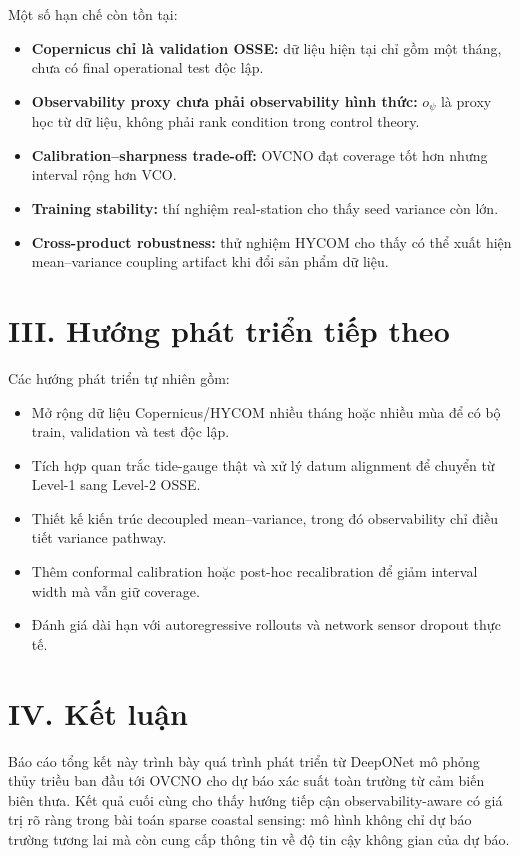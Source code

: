 \documentclass[a4paper, 12pt]{article}
\begin{document}
Một số hạn chế còn tồn tại:
\begin{itemize}
    \item \textbf{Copernicus chỉ là validation OSSE:} dữ liệu hiện tại chỉ gồm một tháng, chưa có final operational test độc lập.
    \item \textbf{Observability proxy chưa phải observability hình thức:} $o_\psi$ là proxy học từ dữ liệu, không phải rank condition trong control theory.
    \item \textbf{Calibration--sharpness trade-off:} OVCNO đạt coverage tốt hơn nhưng interval rộng hơn VCO.
    \item \textbf{Training stability:} thí nghiệm real-station cho thấy seed variance còn lớn.
    \item \textbf{Cross-product robustness:} thử nghiệm HYCOM cho thấy có thể xuất hiện mean--variance coupling artifact khi đổi sản phẩm dữ liệu.
\end{itemize}

\section*{III. Hướng phát triển tiếp theo}

Các hướng phát triển tự nhiên gồm:
\begin{itemize}
    \item Mở rộng dữ liệu Copernicus/HYCOM nhiều tháng hoặc nhiều mùa để có bộ train, validation và test độc lập.
    \item Tích hợp quan trắc tide-gauge thật và xử lý datum alignment để chuyển từ Level-1 sang Level-2 OSSE.
    \item Thiết kế kiến trúc decoupled mean--variance, trong đó observability chỉ điều tiết variance pathway.
    \item Thêm conformal calibration hoặc post-hoc recalibration để giảm interval width mà vẫn giữ coverage.
    \item Đánh giá dài hạn với autoregressive rollouts và network sensor dropout thực tế.
\end{itemize}

\section*{IV. Kết luận}

Báo cáo tổng kết này trình bày quá trình phát triển từ DeepONet mô phỏng thủy triều ban đầu tới OVCNO cho dự báo xác suất toàn trường từ cảm biến biên thưa. Kết quả cuối cùng cho thấy hướng tiếp cận observability-aware có giá trị rõ ràng trong bài toán sparse coastal sensing: mô hình không chỉ dự báo trường tương lai mà còn cung cấp thông tin về độ tin cậy không gian của dự báo.
\end{document}
